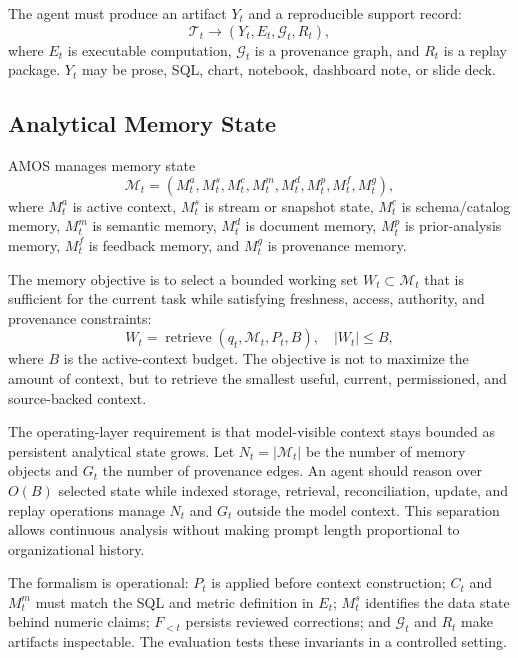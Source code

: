 \documentclass[10pt]{article}
\newcommand{\amos}{\textsc{AMOS}\xspace}
\newcommand{\mem}{\mathcal{M}}
\newcommand{\task}{\mathcal{T}}
\newcommand{\prov}{\mathcal{G}}
\begin{document}
The agent must produce an artifact $Y_t$ and a reproducible support record:
\begin{equation}
    \task_t \rightarrow (Y_t, E_t, \prov_t, R_t),
\end{equation}
where $E_t$ is executable computation, $\prov_t$ is a provenance graph, and $R_t$ is a replay package. $Y_t$ may be prose, SQL, chart, notebook, dashboard note, or slide deck.

\subsection{Analytical Memory State}
\amos manages memory state
\begin{equation}
\mem_t = (M^a_t, M^s_t, M^c_t, M^m_t, M^d_t, M^p_t, M^f_t, M^g_t),
\end{equation}
where $M^a_t$ is active context, $M^s_t$ is stream or snapshot state, $M^c_t$ is schema/catalog memory, $M^m_t$ is semantic memory, $M^d_t$ is document memory, $M^p_t$ is prior-analysis memory, $M^f_t$ is feedback memory, and $M^g_t$ is provenance memory.

The memory objective is to select a bounded working set $W_t \subset \mem_t$ that is sufficient for the current task while satisfying freshness, access, authority, and provenance constraints:
\begin{equation}
    W_t = \operatorname{retrieve}(q_t, \mem_t, P_t, B), \quad |W_t| \le B,
\end{equation}
where $B$ is the active-context budget. The objective is not to maximize the amount of context, but to retrieve the smallest useful, current, permissioned, and source-backed context.

The operating-layer requirement is that model-visible context stays bounded as persistent analytical state grows. Let $N_t = |\mem_t|$ be the number of memory objects and $G_t$ the number of provenance edges. An agent should reason over $O(B)$ selected state while indexed storage, retrieval, reconciliation, update, and replay operations manage $N_t$ and $G_t$ outside the model context. This separation allows continuous analysis without making prompt length proportional to organizational history.

The formalism is operational: $P_t$ is applied before context construction; $C_t$ and $M^m_t$ must match the SQL and metric definition in $E_t$; $M^s_t$ identifies the data state behind numeric claims; $F_{<t}$ persists reviewed corrections; and $\prov_t$ and $R_t$ make artifacts inspectable. The evaluation tests these invariants in a controlled setting.
\end{document}
